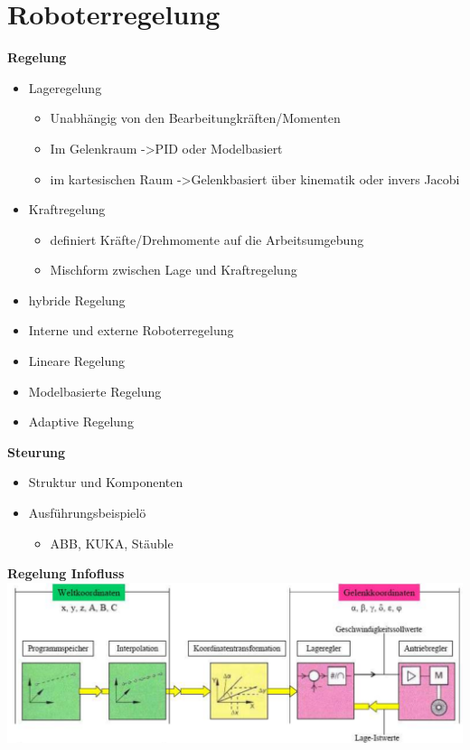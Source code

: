 \section{Roboterregelung}
\begin{minipage}{0.5\linewidth}
    \textbf{Regelung}
    \begin{itemize}
        \item Lageregelung
        \begin{itemize}
            \item Unabhängig von den Bearbeitungkräften/Momenten
            \item Im Gelenkraum ->PID oder Modelbasiert
            \item im kartesischen Raum ->Gelenkbasiert über kinematik oder invers Jacobi
        \end{itemize}
        \item Kraftregelung
        \begin{itemize}
            \item definiert Kräfte/Drehmomente auf die Arbeitsumgebung
        \end{itemize}
        \begin{itemize}
            \item Mischform zwischen Lage und Kraftregelung
        \end{itemize}
        \item hybride Regelung
        \item Interne und externe Roboterregelung
        \item Lineare Regelung
        \item Modelbasierte Regelung
        \item Adaptive Regelung
    \end{itemize}
\end{minipage}
\begin{minipage}{0.5\linewidth}
    \textbf{Steurung}
    \begin{itemize}
        \item Struktur und Komponenten
        \item Ausführungsbeispielö
        \begin{itemize}
            \item ABB, KUKA, Stäuble
        \end{itemize}
    \end{itemize}
\end{minipage}
\textbf{Regelung Infofluss}\newline
    \includegraphics[width=\linewidth]{./bilder/RegelungInfofluss}

